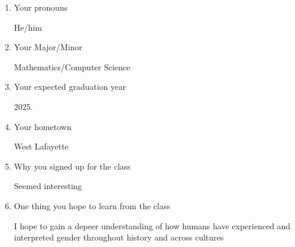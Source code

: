 \documentclass{article}
\begin{document}
\begin{enumerate}
  \item Your pronouns

  He/him
  \item Your Major/Minor

  Mathematics/Computer Science
  \item Your expected graduation year

  2025.
  \item Your hometown

  West Lafayette
  \item Why you signed up for the class

  Seemed interesting
  \item One thing you hope to learn from the class

  I hope to gain a depeer understanding of how humans have experienced and interpreted gender throughout history and across cultures
\end{enumerate}
\end{document}
